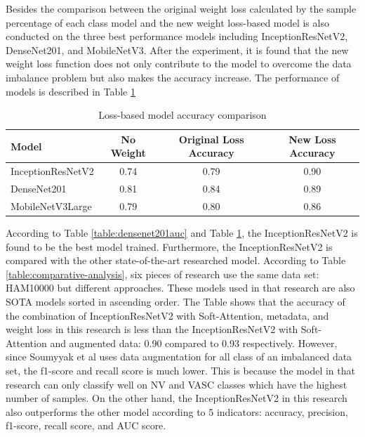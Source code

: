 \documentclass[sensors,article,submit,pdftex,moreauthors]{Definitions/mdpi}
\begin{document}
	Besides the comparison between the original weight loss calculated by the sample percentage of each class model and the new weight loss-based model is also conducted on the three best performance models including InceptionResNetV2, DenseNet201, and MobileNetV3. After the experiment, it is found that the new weight loss function does not only contribute to the model to overcome the data imbalance problem but also makes the accuracy increase. The performance of models is described in Table \ref{table:loss-comparision}
	
	\begin{table}[H]
		\centering
		\begin{tabular}{| l | c | c | c |}
			\hline
			Model & No Weight & Original Loss Accuracy & New Loss Accuracy\\
			\hline
			InceptionResNetV2 & 0.74 & 0.79 & 0.90\\
			DenseNet201 & 0.81 & 0.84 & 0.89\\
			MobileNetV3Large & 0.79 & 0.80 & 0.86\\
			\hline
		\end{tabular}
		\caption{Loss-based model accuracy comparison}
		\label{table:loss-comparision}
	\end{table} 
	
	According to Table \ref{table:densenet201auc} and Table \ref{table:loss-comparision}, the InceptionResNetV2 is found to be the best model trained. Furthermore, the InceptionResNetV2 is compared with the other state-of-the-art researched model. According to Table \ref{table:comparative-analysis}, six pieces of research use the same data set: HAM10000 but different approaches. These models used in that research are also SOTA models sorted in ascending order. The Table shows that the accuracy of the combination of InceptionResNetV2 with Soft-Attention, metadata, and weight loss in this research is less than the InceptionResNetV2 with Soft-Attention and augmented data: 0.90 compared to 0.93 respectively. However, since Soumyyak et al uses data augmentation for all class of an imbalanced data set, the f1-score and recall score is much lower. This is because the model in that research can only classify well on NV and VASC classes which have the highest number of samples. On the other hand, the InceptionResNetV2 in this research also outperforms the other model according to 5 indicators: accuracy, precision, f1-score, recall score, and AUC score. 
	
\end{document}

